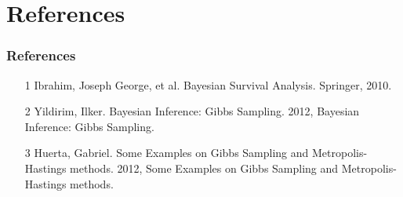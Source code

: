 \documentclass{beamer}
\begin{document}
\section{References}
\begin{frame}
\frametitle{References}
\begin{enumerate}
\item[1] Ibrahim, Joseph George, et al. Bayesian Survival Analysis. Springer, 2010.
\item[2] Yildirim, Ilker. Bayesian Inference: Gibbs Sampling. 2012, Bayesian Inference: Gibbs Sampling.
\item[3] Huerta, Gabriel. Some Examples on Gibbs Sampling and Metropolis-Hastings methods. 2012, Some Examples on Gibbs Sampling and Metropolis-Hastings methods. 
\end{enumerate}
\end{frame}
\end{document}
